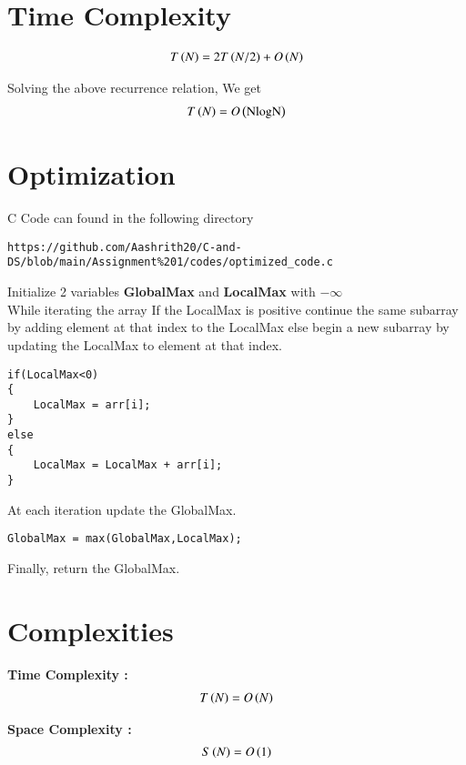 \documentclass[journal,12pt,twocolumn]{IEEEtran}
\begin{document}
\section{Time Complexity}
\begin{align}
    T\left(N\right) = 2T\left(N/2\right) + O\left(N\right)
\end{align}

Solving the above recurrence relation, We get\\
\begin{align}
    T\left(N\right) = O\left(\text{NlogN}\right)
\end{align}


\section{Optimization}
C Code can found in the following directory
\begin{lstlisting}
https://github.com/Aashrith20/C-and-DS/blob/main/Assignment%201/codes/optimized_code.c
\end{lstlisting}

Initialize 2 variables \textbf{GlobalMax} and \textbf{LocalMax} with $-\infty$ \\

While iterating the array If the LocalMax is positive continue the same subarray by adding element at that index to the LocalMax else begin a new subarray by updating the LocalMax to element at that index.\\

\begin{lstlisting}
if(LocalMax<0)
{
    LocalMax = arr[i];
}
else
{
    LocalMax = LocalMax + arr[i];
}
\end{lstlisting}

At each iteration update the GlobalMax.\\
\begin{lstlisting}
GlobalMax = max(GlobalMax,LocalMax);
\end{lstlisting}

Finally, return the GlobalMax.

\section{Complexities}

\textbf{Time Complexity :}
\begin{align}
    T\left(N\right) = O\left(N\right)
\end{align}

\textbf{Space Complexity :}
\begin{align}
    S\left(N\right) = O\left(1\right)
\end{align}
\end{document}

